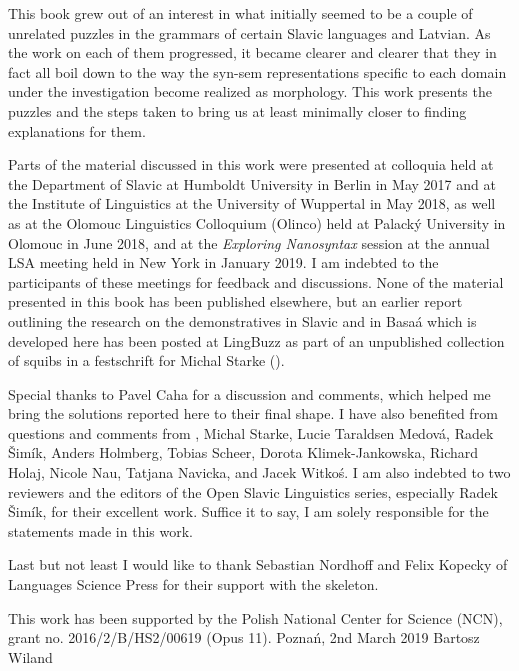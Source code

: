
This book grew out of an interest in what initially seemed to be a couple of unrelated puzzles in the grammars of certain Slavic languages and Latvian. As the work on each of them progressed, it became clearer and clearer that they in fact all boil down to the way the syn-sem representations specific to each domain under the investigation become realized as morphology. This work presents the puzzles and the steps taken to bring us at least minimally closer to finding explanations for them.
\par
Parts of the material discussed in this work were presented at colloquia held at the Department of Slavic at Humboldt University in Berlin in May 2017 and at the Institute of Linguistics at the University of Wuppertal in May 2018, as well as at the Olomouc Linguistics Colloquium (Olinco) held at Palack\'y University in Olomouc in June 2018, and at the \textit{Exploring Nanosyntax} session at the annual LSA meeting held in New York in January 2019. I am indebted to the participants of these meetings for feedback and discussions. None of the material presented in this book has been published elsewhere, but an earlier report outlining the research on the demonstratives in Slavic and in Basa\'a which is developed here has been posted at LingBuzz as part of an unpublished collection of squibs in a festschrift for Michal Starke (\citealt{WilandTUM}). 
\par 
Special thanks to  Pavel Caha for a discussion and comments, which helped me bring the solutions reported here to their final shape.
I have also benefited from questions and comments from , Michal Starke,   Lucie Taraldsen Medov\'a,   Radek \v{S}im\'ik,   Anders Holmberg,  Tobias Scheer,   Dorota Klimek-Jankowska,  Richard Holaj,  Nicole Nau,   Tatjana Navicka, and  Jacek Witko\'s. I am also indebted to two reviewers and the editors of the Open Slavic Linguistics series, especially Radek \v{S}im\'ik, for their excellent work. Suffice it to say, I am solely responsible for the statements made in this work. 
\par
Last but not least I would like to thank  Sebastian Nordhoff  and Felix Kopecky  of Languages Science Press for their support with the \XeLaTeX{} skeleton.
 \par
 This work has been supported by the Polish National Center for Science (NCN), grant no. 2016/2/B/HS2/00619 (Opus 11).
\bigbreak
\noindent 
Pozna\'n, 2nd March 2019 \hfill Bartosz Wiland


\begin{refsection}
\printbibliography[heading=subbibliography]
\end{refsection}

